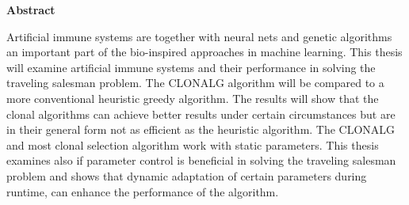 %
%
% 
% 
% 



\cleardoublepage


\begin{center}
{\Large\bfseries Abstract}
\end{center}
Artificial immune systems are together with neural nets and genetic algorithms an important part of the bio-inspired approaches in machine learning. This thesis will examine artificial immune systems and their performance in solving the traveling salesman problem. The CLONALG algorithm will be compared to a more conventional heuristic greedy algorithm. The results will show that the clonal algorithms can achieve better results under certain circumstances but are in their general form not as efficient as the heuristic algorithm. The CLONALG and most clonal selection algorithm work with static parameters. This thesis examines also if parameter control is beneficial in solving the traveling salesman problem and shows that dynamic adaptation of certain parameters during runtime, can enhance the performance of the algorithm. 

